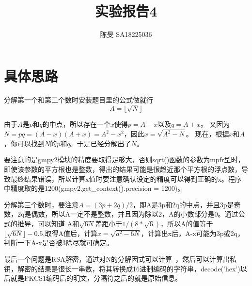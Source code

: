 \documentclass[UTF8]{article}
\title{实验报告4}
\author{陈旻 SA18225036}
\date{}
\begin{document}
\maketitle
\section{具体思路}
\paragraph{}
分解第一个和第二个数时安装题目里的公式做就行
$$ A = \lfloor \sqrt{N} \rfloor $$

由于$ A $是$ p $和$ q $的中点，所以存在一个$ x $使得$ p = A - x $以及$ q = A + x $。
又因为$ N = pq = (A - x)(A + x) = A^2 - x^2 $，因此$ x = \sqrt{A^2 - N} $。
现在，根据$ x $和$ A $，你可以找到$ N $的$ p $和$ q $。于是已经分解出了$ N $。

要注意的是gmpy2模块的精度要取得足够大，否则sqrt()函数的参数为mpfr型时，即使该参数的平方根也是整数，得出的结果可能是很趋近那个平方根的浮点数，导致最终结果错误，所以计算x值时要注意确认设定的精度可以得到正确的x。程序中精度取的是1200(gmpy2.get\_context().precision = 1200)。

分解第三个数时，要注意$ A=(3p+2q)/2 $，即A是3p和2q的中点，并且3p是奇数，2q是偶数，所以A一定不是整数，并且因为除以2，A的小数部分是0。通过公式的推导，可以知道 A和$ \sqrt{6N} $差距小于$ 1/(8*\sqrt{6})$，所以A的值等于 $\lfloor \sqrt{6N} \rfloor-0.5$,取得A值后，计算$ x=\sqrt{a^2-6N}$，计算出x后，A-x可能为3p或2q，判断一下A-x是否被3除尽就可确定。

最后一个问题是RSA解密，通过对N的分解因式可以计算 ，然后可以计算出私钥，解密的结果是很长一串数，将其转换成16进制编码的字符串，decode('hex')以后就是PKCS1编码后的明文，分隔符之后的就是原始信息。
\end{document}
